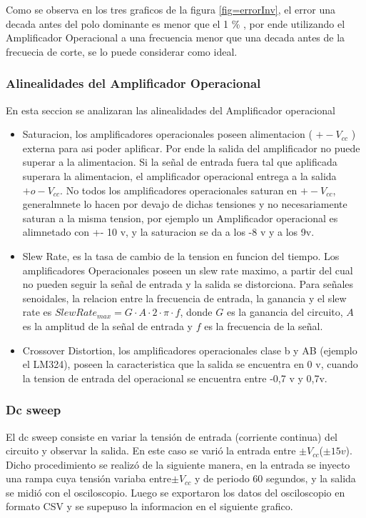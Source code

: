 \documentclass[../../main.tex]{subfiles}
\begin{document}
Como se observa en los tres graficos de la figura \ref{fig=errorInv}, el error una decada antes del polo dominante es menor que el 1 \% , por ende utilizando el Amplificador Operacional a una frecuencia menor que una decada antes de la frecuecia de corte, se lo puede considerar como ideal.
\subsubsection{Alinealidades del Amplificador Operacional}
En esta seccion se analizaran las alinealidades del Amplificador operacional
\begin{itemize}  
\item Saturacion, los amplificadores operacionales poseen alimentacion ( $+-V_{cc}$ ) externa para asi poder aplificar. Por ende la salida del amplificador no puede superar a la alimentacion. Si la señal de entrada fuera tal que aplificada superara la alimentacion, el amplificador operacional entrega a la salida $+ o -V_{cc}$. No todos los amplificadores operacionales saturan en $+-V_{cc}$, generalmnete lo hacen por devajo de dichas tensiones y no necesariamente saturan a la misma tension, por ejemplo un Amplificador operacional es alimnetado con +- 10 v, y la saturacion se da a los -8 v y a los 9v. 
\item Slew Rate, es la tasa de cambio de la tension en funcion del tiempo. Los amplificadores Operacionales poseen un slew rate maximo, a partir del cual no pueden seguir la señal de entrada y la salida se distorciona. Para señales senoidales, la relacion entre la frecuencia de entrada, la ganancia y el slew rate es $ SlewRate_{max}=G  \cdot A \cdot 2 \cdot \pi \cdot f $, donde $ G $ es la ganancia del circuito, $ A $ es la amplitud de la señal de entrada y $f$ es la frecuencia de la señal.  
\item Crossover Distortion, los amplificadores operacionales clase b y AB (ejemplo el LM324), poseen la caracteristica que la salida se encuentra en 0 v, cuando la tension de entrada del operacional se encuentra entre -0,7 v y 0,7v.
\end{itemize}

\subsubsection{Dc sweep}
El dc sweep consiste en variar la tensión de entrada (corriente continua) del circuito y observar la salida. En este caso se varió la entrada entre $\pm V_{cc}$($\pm 15 v$). Dicho procedimiento se realizó de la siguiente manera, en la entrada se inyecto una rampa  cuya  tensión variaba entre$\pm V_{cc}$ y de periodo 60 segundos, y la salida se midió con el osciloscopio. Luego se exportaron los datos del osciloscopio en formato CSV y se supepuso la informacion en el siguiente grafico.
\end{document}
